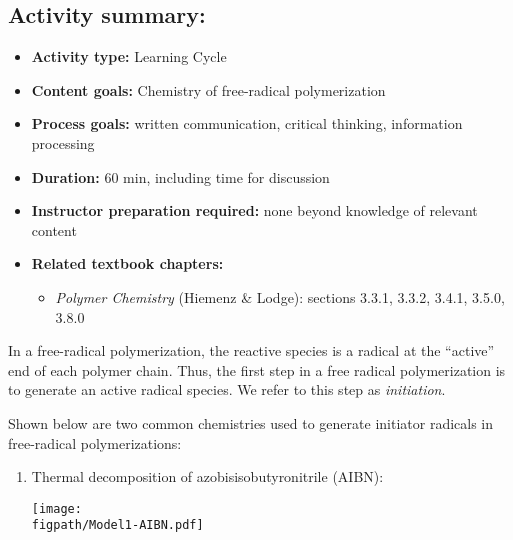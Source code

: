 \begin{activity}
\begin{instructornotes}
	\subsection*{Activity summary:}
	\begin{itemize}
		\item \textbf{Activity type:} Learning Cycle
		\item \textbf{Content goals:} Chemistry of free-radical polymerization
		\item \textbf{Process goals:} %
			written communication, critical thinking, information processing
		\item \textbf{Duration:} 60 min, including time for discussion
		\item \textbf{Instructor preparation required:} none beyond knowledge of relevant content
		\item \textbf{Related textbook chapters:}
			\begin{itemize}
				\item \emph{Polymer Chemistry} (Hiemenz \& Lodge): sections 3.3.1, 3.3.2, 3.4.1, 3.5.0, 3.8.0
			\end{itemize}
	\end{itemize}
	
\end{instructornotes}


\begin{model}[Initiation]
	\label{\labelbase:mdl:FRPinitchem}

	In a free-radical polymerization, the reactive species is a radical at the ``active'' end of each polymer chain.  Thus, the first step in a free radical polymerization is to generate an active radical species.  We refer to this step as \emph{initiation}.
	
	Shown below are two common chemistries used to generate initiator radicals in free-radical polymerizations:
	
	\begin{enumerate}
		\item Thermal decomposition of azobisisobutyronitrile (AIBN):
	
			\centerline{\texttt{[image: \\figpath/Model1-AIBN.pdf]}}
			

\end{enumerate}
\end{model}
\end{activity}
